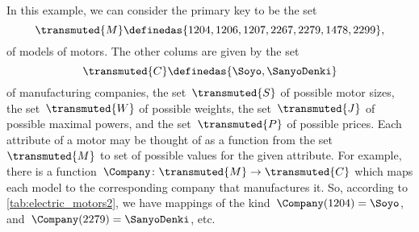 \begin{comment}
    \begin{table*}[h]
        \centering
        \begin{tabular}{c|c|c|c|c|c}
            Motor ID          & Company              & Size      & \unit[Weight]{[g]} & \unit[Max Power]{[W]} & \unit[price]{[USD]} \\
            \hline
            $\textsf{Model1}$ & Company $\textsf{B}$ & 2 x 3 x 4 & 10                 &                       & 259                 \\
            $\textsf{Model2}$ & Company $\textsf{A}$ & 2 x 3 x 4 & 20                 &                       & 109                 \\
            $\textsf{Model3}$ & Company $\textsf{B}$ & 2 x 3 x 4 & 5                  &                       & 124                 \\
            $\textsf{Model4}$ & Company $\textsf{C}$ & 2 x 3 x 4 & 30                 &                       & 399                 \\
            $\textsf{Model5}$ & Company $\textsf{A}$ & 2 x 3 x 4 & 45                 &                       & 245                 \\
            $\textsf{Model6}$ & Company $\textsf{D}$ & 2 x 3 x 4 & 20                 &                       & 89                  \\
            $\textsf{Model7}$ & Company $\textsf{B}$ & 2 x 3 x 4 & 15                 &                       & 130
        \end{tabular}
        \caption{A simplified catalogue of motors.}
        \label{tab:electric_motors2}
    \end{table*}
\end{comment}

In this example, we can consider the primary key to be the set
\begin{equation*}
    \transmuted{M} \definedas \{ 1204, 1206, 1207, 2267, 2279, 1478, 2299 \},
\end{equation*}
of models of motors. The other colums are given by the set
\begin{equation*}
    \transmuted{C} \definedas \{ \Soyo,\SanyoDenki\}
\end{equation*}
of manufacturing companies, the set~$\transmuted{S}$ of possible motor sizes, the set~$\transmuted{W}$ of possible weights, the set~$\transmuted{J}$ of possible maximal powers, and the set~$\transmuted{P}$ of possible prices. Each attribute of a motor may be thought of as a function from the set~$\transmuted{M}$ to set of possible values for the given attribute. For example, there is a function~$\Company\colon \transmuted{M} \to \transmuted{C}$ which maps each model to the corresponding company that manufactures it. So, according to \cref{tab:electric_motors2}, we have mappings of the kind~$\Company(1204) = \Soyo$, and~$\Company(2279) =\SanyoDenki$, etc.

